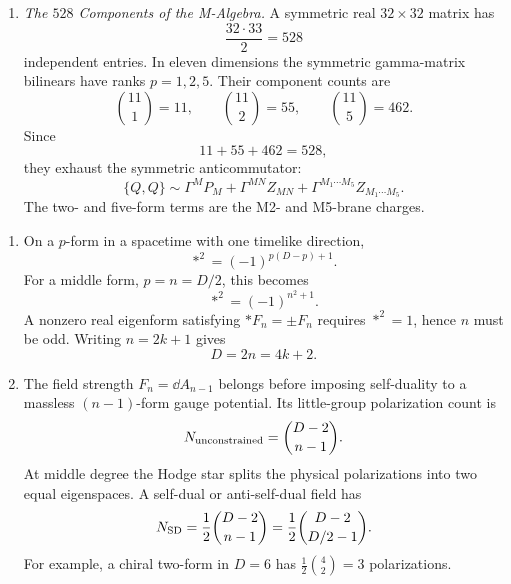 \begin{enumerate}
\begin{enumerate}
      Multiplication by the volume gamma matrix relates rank \(p\) to rank
      \(d-p\); on an irreducible chiral space one retains only one member
      of each dual pair.  Finally,
      \(\{Q_\alpha,Q_\beta\}\) is symmetric in \(\alpha,\beta\).
      Expanding it in the complete gamma basis therefore keeps exactly
      those \(\gamma^{[p]}C\) that are symmetric, with internal-index
      antisymmetry compensating when extended supersymmetry is present.
      No additional bosonic spinor structure is possible.
    \item \emph{The \(528\) Components of the M-Algebra.}
    A symmetric real \(32\times32\) matrix has
      \[
        \frac{32\cdot33}{2}=528
      \]
      independent entries.  In eleven dimensions the symmetric
      gamma-matrix bilinears have ranks \(p=1,2,5\).  Their component
      counts are
      \[
        \binom{11}{1}=11,\qquad
        \binom{11}{2}=55,\qquad
        \binom{11}{5}=462.
      \]
      Since
      \[
        11+55+462=528,
      \]
      they exhaust the symmetric anticommutator:
      \[
        \{Q,Q\}\sim
          \Gamma^M P_M+\Gamma^{MN}Z_{MN}
           +\Gamma^{M_1\cdots M_5}Z_{M_1\cdots M_5}.
      \]
      The two- and five-form terms are the M2- and M5-brane charges.
  \end{enumerate}

  \begin{enumerate}
    \item On a \(p\)-form in a spacetime with one timelike direction,
      \[
        *^2=(-1)^{p(D-p)+1}.
      \]
      For a middle form, \(p=n=D/2\), this becomes
      \[
        *^2=(-1)^{n^2+1}.
      \]
      A nonzero real eigenform satisfying \(*F_n=\pm F_n\) requires
      \(*^2=1\), hence \(n\) must be odd.  Writing \(n=2k+1\) gives
      \[
        D=2n=4k+2.
      \]

    \item The field strength \(F_n=\dd A_{n-1}\) belongs before imposing
      self-duality to a massless \((n-1)\)-form gauge potential.  Its
      little-group polarization count is
      \[
        N_{\rm unconstrained}=\binom{D-2}{n-1}.
      \]
      At middle degree the Hodge star splits the physical polarizations
      into two equal eigenspaces.  A self-dual or anti-self-dual field has
      \[
        N_{\rm SD}=\frac12\binom{D-2}{n-1}
          =\frac12\binom{D-2}{D/2-1}.
      \]
      For example, a chiral two-form in \(D=6\) has
      \(\tfrac12\binom42=3\) polarizations.


\end{enumerate}
\end{enumerate}
